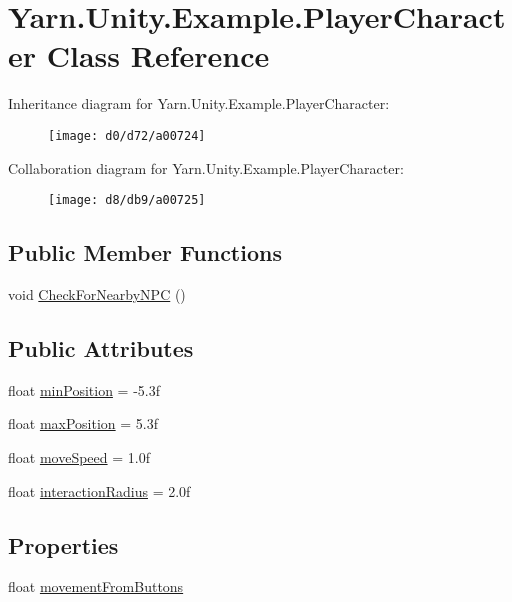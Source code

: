 \hypertarget{a00124}{\section{Yarn.\-Unity.\-Example.\-Player\-Character Class Reference}
\label{a00124}
}


Inheritance diagram for Yarn.\-Unity.\-Example.\-Player\-Character\-:
\nopagebreak
\begin{figure}[H]
\begin{center}
\leavevmode
\texttt{[image: d0/d72/a00724]}
\end{center}
\end{figure}


Collaboration diagram for Yarn.\-Unity.\-Example.\-Player\-Character\-:
\nopagebreak
\begin{figure}[H]
\begin{center}
\leavevmode
\texttt{[image: d8/db9/a00725]}
\end{center}
\end{figure}
\subsection*{Public Member Functions}
\begin{DoxyCompactItemize}
\item 
void \hyperlink{a00124_a574b6d984b8671c7a780d3d10e040a9b}{Check\-For\-Nearby\-N\-P\-C} ()
\end{DoxyCompactItemize}
\subsection*{Public Attributes}
\begin{DoxyCompactItemize}
\item 
float \hyperlink{a00124_ac025d4f4afaf854f8256e0d2d03e5b52}{min\-Position} = -\/5.\-3f
\item 
float \hyperlink{a00124_ada9dd748a1d89a7f9b12ac8967a07ae6}{max\-Position} = 5.\-3f
\item 
float \hyperlink{a00124_adc602a4b2c7e44e4b15a11f1ffcf07e4}{move\-Speed} = 1.\-0f
\item 
float \hyperlink{a00124_af89807d2195915ee9a0c42317e110fc6}{interaction\-Radius} = 2.\-0f
\end{DoxyCompactItemize}
\subsection*{Properties}
\begin{DoxyCompactItemize}
\item 
float \hyperlink{a00124_a7bcde19f080bfd09bbc833b8fb555cf7}{movement\-From\-Buttons}
\end{DoxyCompactItemize}

